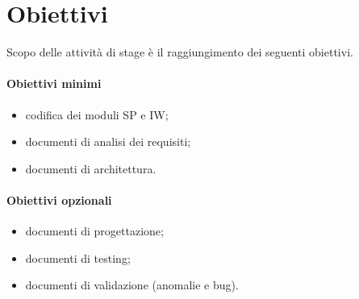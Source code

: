 \section{Obiettivi}

Scopo delle attività di stage è il raggiungimento dei seguenti obiettivi.\\
\paragraph{Obiettivi minimi}
\begin{itemize}
    \item codifica dei moduli SP e IW;
    \item documenti di analisi dei requisiti;
    \item documenti di architettura.
\end{itemize}
    
\paragraph{Obiettivi opzionali}
\begin{itemize}
    \item documenti di progettazione;
    \item documenti di testing;
    \item documenti di validazione (anomalie e bug).
\end{itemize}
    

